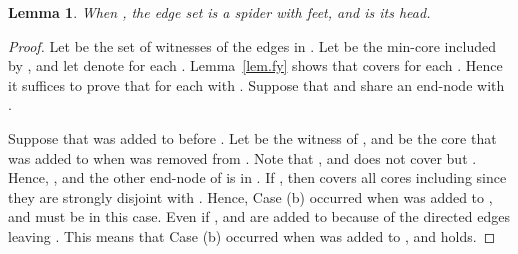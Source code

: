 \documentclass[11pt]{article}
\newtheorem{lemma}{Lemma}
\begin{document}
 \begin{lemma}\label{lem.spider2}
 When ,
  the edge set 
  is a spider with  feet, and  is its head.
\end{lemma}
\begin{proof}
 Let  be the set of witnesses of
 the edges in .
 Let  be the min-core included by ,
 and let  denote 
 for each .
 Lemma~\ref{lem.fy} shows that  covers 
 for each .
 Hence it suffices to prove that 
  for each
  with .
 Suppose that  and  share an
 end-node  with .
 
 Suppose that  was added to 
 before .
 Let 
 be the witness of , and  be the core 
 that was added to  when  was removed from .
 Note that , and
  does not cover  but .
 Hence, ,
 and the other end-node of  is in .
 If , then
  covers all cores including 
 since they are strongly disjoint with .
 Hence, Case (b) occurred when  was added to , 
 and  must be  in this case.
 Even if , 
  and  are added to  because of the directed edges leaving .
 This means that
 Case (b) occurred when  was added to ,
 and  holds.
\end{proof}
\end{document}
